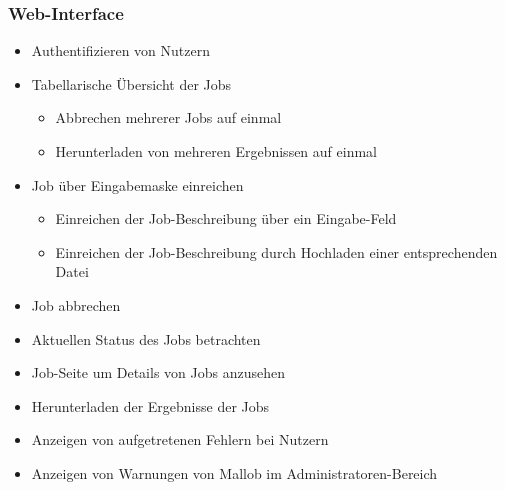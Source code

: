     \subsubsection{Web-Interface}
        \begin{itemize}[noitemsep]
            \item Authentifizieren von Nutzern
            \item Tabellarische Übersicht  der Jobs
                \begin{itemize}[noitemsep]
                    \item Abbrechen mehrerer Jobs auf einmal
                    \item Herunterladen von mehreren Ergebnissen auf einmal
                \end{itemize}
            \item Job über Eingabemaske einreichen
                \begin{itemize}[noitemsep]
                    \item Einreichen der Job-Beschreibung über ein Eingabe-Feld
                    \item Einreichen der Job-Beschreibung durch Hochladen einer entsprechenden Datei
                \end{itemize}
            \item Job abbrechen
            \item Aktuellen Status des Jobs betrachten
            \item Job-Seite um Details von Jobs anzusehen
            \item Herunterladen der Ergebnisse der Jobs
            \item Anzeigen von aufgetretenen Fehlern bei Nutzern
            \item Anzeigen von Warnungen von Mallob im Administratoren-Bereich 
            
                      
        \end{itemize}
